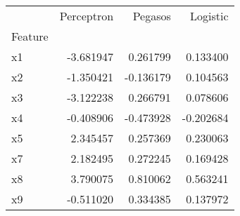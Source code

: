 \begin{tabular}{lrrr}
\toprule
 & Perceptron & Pegasos & Logistic \\
Feature &  &  &  \\
\midrule
x1 & -3.681947 & 0.261799 & 0.133400 \\
x2 & -1.350421 & -0.136179 & 0.104563 \\
x3 & -3.122238 & 0.266791 & 0.078606 \\
x4 & -0.408906 & -0.473928 & -0.202684 \\
x5 & 2.345457 & 0.257369 & 0.230063 \\
x7 & 2.182495 & 0.272245 & 0.169428 \\
x8 & 3.790075 & 0.810062 & 0.563241 \\
x9 & -0.511020 & 0.334385 & 0.137972 \\
\bottomrule
\end{tabular}
